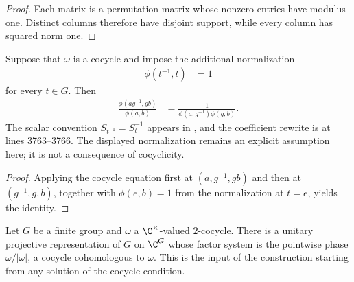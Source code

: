 \begin{proof}\leanok
    Each matrix is a permutation matrix whose nonzero entries have modulus
    one.  Distinct columns therefore have disjoint support, while every column
    has squared norm one.
\end{proof}

\begin{lemma}
    \label{thm:mpug_onsite_gauss_phase}
    \leanok
    Suppose that $\omega$ is a cocycle and impose the additional normalization
    \begin{align}
        \phi(t^{-1},t) & =1
    \end{align}
    for every $t\in G$.  Then
    \begin{align}
        \frac{\phi(ag^{-1},gb)}{\phi(a,b)}
         & =\frac{1}{\phi(a,g^{-1})\phi(g,b)}.
        \label{eq:mpug_onsite_gauss_phase}
    \end{align}
    The scalar convention $S_{t^{-1}}=S_t^{-1}$ appears in
    \cite[line~238]{FrancoRubio2025MPUGauging}, and the coefficient rewrite is
    at lines 3763--3766. The displayed normalization remains an explicit
    assumption here; it is not a consequence of cocyclicity.
\end{lemma}

\begin{proof}\leanok
    Applying the cocycle equation first at $(a,g^{-1},gb)$ and then at
    $(g^{-1},g,b)$, together with $\phi(e,b)=1$ from the normalization at
    $t=e$, yields the identity.
\end{proof}

\begin{theorem}
    \label{thm:twisted_regular_projective}
    \leanok
    Let $G$ be a finite group and $\omega$ a $\C^\times$-valued $2$-cocycle.
    There is a unitary projective representation of $G$ on $\C^G$ whose
    factor system is the pointwise phase $\omega/|\omega|$, a cocycle
    cohomologous to $\omega$. This is the input of the construction
    \cite[Section~III.A]{Cirac2021Matrix} starting from any solution of the
    cocycle condition.
\end{theorem}

